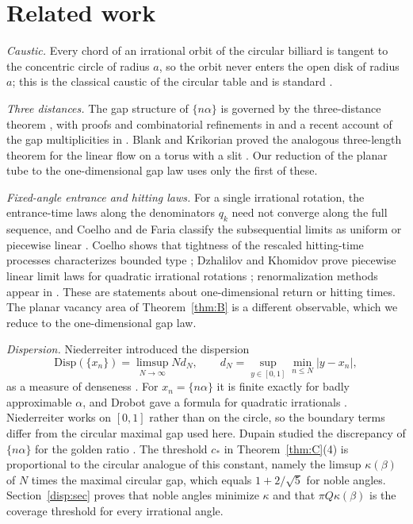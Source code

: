 \section{Related work}\label{sec:related}

\emph{Caustic.} Every chord of an irrational orbit of the circular billiard is tangent to the
concentric circle of radius $a$, so the orbit never enters the open disk of radius $a$; this
is the classical caustic of the circular table and is standard \cite{Tab05}.

\emph{Three distances.} The gap structure of $\{n\alpha\}$ is governed by the three-distance
theorem \cite{Sos58,Swier59,Slater67}, with proofs and combinatorial refinements in
\cite{vRav88,AB98} and a recent account of the gap multiplicities in \cite{Leong17}. Blank and
Krikorian proved the analogous three-length theorem for the linear flow on a torus with a slit
\cite{BK93}. Our reduction of the planar tube to the one-dimensional gap law uses only the first
of these.

\emph{Fixed-angle entrance and hitting laws.} For a single irrational rotation, the entrance-time
laws along the denominators $q_k$ need not converge along the full sequence, and Coelho and de
Faria classify the subsequential limits as uniform or piecewise linear \cite{CdF96}. Coelho shows
that tightness of the rescaled hitting-time processes characterizes bounded type
\cite{Coelho04}; Dzhalilov and Khomidov prove piecewise linear limit laws for quadratic
irrational rotations \cite{DK24}; renormalization methods appear in \cite{BI09}. These are
statements about one-dimensional return or hitting times. The planar vacancy area of
Theorem~\ref{thm:B} is a different observable, which we reduce to the one-dimensional gap law.

\emph{Dispersion.} Niederreiter introduced the dispersion
\[\mathrm{Disp}(\{x_n\})=\limsup_{N\to\infty} N d_N,\qquad d_N=\sup_{y\in[0,1]}\min_{n\le N}|y-x_n|,\]
as a measure of denseness \cite{Nie84}. For $x_n=\{n\alpha\}$
it is finite exactly for badly approximable $\alpha$, and Drobot gave a formula for quadratic
irrationals \cite{Dro86}. Niederreiter works on $[0,1]$ rather than on the circle, so the
boundary terms differ from the circular maximal gap used here. Dupain studied the discrepancy of
$\{n\alpha\}$ for the golden ratio \cite{Dup79}. The threshold $c_*$ in
Theorem~\ref{thm:C}(4) is proportional to the circular analogue of this constant, namely
the limsup $\kappa(\beta)$ of $N$ times the maximal circular gap, which equals $1+2/\sqrt5$
for noble angles. Section~\ref{disp:sec} proves that noble angles minimize $\kappa$ and
that $\pi Q\kappa(\beta)$ is the coverage threshold for every irrational angle.

